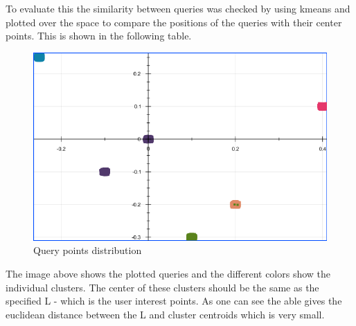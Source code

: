\documentclass{lmproj}
\begin{document}
\begin{figure} [h!]
\end{figure}
 
To evaluate this the similarity between queries was checked by using kmeans and plotted over the space to compare the positions of the queries with their center points. This is shown in the following table.

\begin{figure}[h]
\centering
\includegraphics[width=.7\textwidth]{inputOfQuery.png}
\caption{Query points distribution}
\label{qpd}
\end{figure}

The image above shows the plotted queries and the different colors show the individual clusters. The center of these clusters should be the same as the specified L - which is the user interest points. As one can see the able gives the euclidean distance between the L and cluster centroids which is very small.
\end{document}
